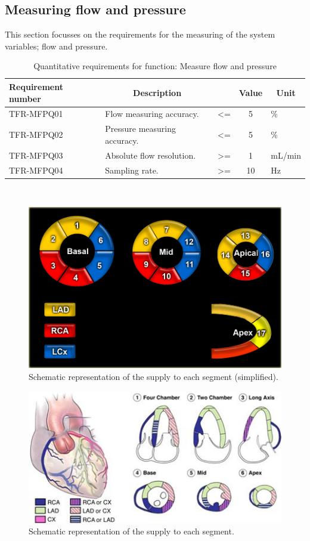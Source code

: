 \subsection{Measuring flow and pressure}
This section focusses on the requirements for the measuring of the system variables; flow and pressure.
\begin{table}[H]
\caption{Quantitative requirements for function: Measure flow and pressure}
\label{tab:measflow_quan}
\begin{tabular}{p{25mm}|p{65mm}ccp{20mm}|}
	\textbf{Requirement number} & \multicolumn{1}{c}{\textbf{Description}} & \multicolumn{1}{c}{ } & \multicolumn{1}{c}{\textbf{Value}} & \multicolumn{1}{c}{\textbf{Unit}} \\
	\hline
	TFR-MFPQ01	& Flow measuring accuracy. 		 			 & <= 		& 5 		& \% \\
	TFR-MFPQ02 	& Pressure measuring accuracy.		 		 & <= 		& 5 		& \% \\
	TFR-MFPQ03 	& Absolute flow resolution.				 	 & >=	 	& 1 		& mL/min \\
	TFR-MFPQ04  & Sampling rate.					 		 & >= 		& 10 		& Hz \\
	\cline{2-5}
\end{tabular} \\
\raggedright
\end{table}

\begin{figure}[H]
	\includegraphics[width=0.5\linewidth]{./images/17_supply.png}
	\caption{Schematic representation of the supply to each segment (simplified).}
	\label{fig:segment_supply}
\end{figure}

\begin{figure}[H]
	\includegraphics[width=0.5\linewidth]{./images/17_segment_2.jpg}
	\caption{Schematic representation of the supply to each segment.}
	\label{fig:segment_supply2}
\end{figure}

